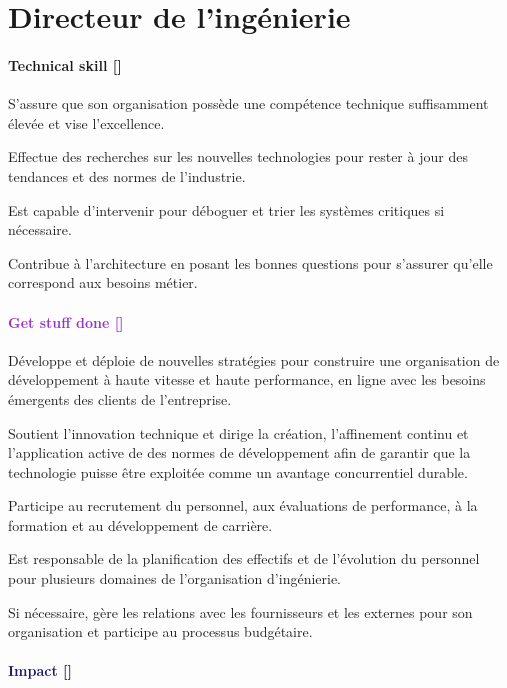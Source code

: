 \documentclass[a4paper, french, openany, 12pt]{book}
\newcommand\dex{\textcolor{BrickRed}{\textbf{Technical skill [\bsc{DEX}]}}}
\newcommand\str{\textcolor{DarkOrchid}{\textbf{Get stuff done [\bsc{STR}]}}}
\newcommand\wis{\textcolor{MidnightBlue}{\textbf{Impact [\bsc{WIS}]}}}
\begin{document}
\chapter{Directeur de l'ingénierie}

\begin{multicols}{2}

  \subsubsection*{\dex}

  S'assure que son organisation possède une compétence technique suffisamment élevée et vise l'excellence.

  Effectue des recherches sur les nouvelles technologies pour rester à jour des tendances et des normes de l'industrie.

  Est capable d'intervenir pour déboguer et trier les systèmes critiques si nécessaire.

  Contribue à l'architecture en posant les bonnes questions pour s'assurer qu'elle correspond aux besoins métier.

  \subsubsection*{\str}

  Développe et déploie de nouvelles stratégies pour construire une organisation de développement à haute vitesse et haute 
  performance, en ligne avec les besoins émergents des clients de l'entreprise.

  Soutient l'innovation technique et dirige la création, l'affinement continu et l'application active de des normes de 
  développement afin de garantir que la technologie puisse être exploitée comme un avantage concurrentiel durable.

  Participe au recrutement du personnel, aux évaluations de performance, à la formation et au développement de carrière. 

  Est responsable de la planification des effectifs et de l'évolution du personnel pour plusieurs domaines de 
  l'organisation d'ingénierie.

  Si nécessaire, gère les relations avec les fournisseurs et les externes pour son organisation et participe au processus 
  budgétaire.

  \subsubsection*{\wis}


\end{multicols}
\end{document}
